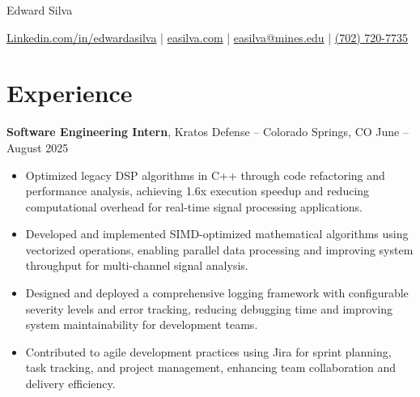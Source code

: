 \documentclass[11pt]{article}       %
\begin{document}
\centerline{\huge Edward Silva}
\vspace{5pt}

\centerline{
\href{https://www.linkedin.com/in/edwardasilva/}{Linkedin.com/in/edwardasilva}
| \href{https://easilva.com}{easilva.com}
| \href{mailto:easilva@mines.edu}{easilva@mines.edu} 
| \href{tel:7027207735}{(702) 720-7735}
}

\vspace{-12pt}
\section*{Experience}
\vspace{3pt}

\textbf{Software Engineering Intern}, Kratos Defense -- Colorado Springs, CO \hfill June -- August 2025 
\vspace{-5pt}
\begin{itemize}
  \item Optimized legacy DSP algorithms in C++ through code refactoring and performance analysis, achieving 1.6x execution speedup and reducing computational overhead for real-time signal processing applications.
  \item Developed and implemented SIMD-optimized mathematical algorithms using vectorized operations, enabling parallel data processing and improving system throughput for multi-channel signal analysis.
  \item Designed and deployed a comprehensive logging framework with configurable severity levels and error tracking, reducing debugging time and improving system maintainability for development teams.
  \item Contributed to agile development practices using Jira for sprint planning, task tracking, and project management, enhancing team collaboration and delivery efficiency.
\end{itemize}
\end{document}
